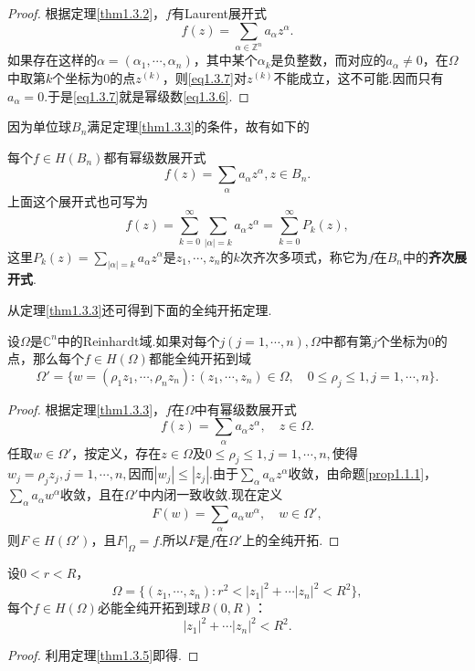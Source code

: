 \begin{proof}
	根据定理\ref{thm1.3.2}，$f$有Laurent展开式
	\begin{equation}\label{eq1.3.7}
		f(z)=\sum_{\alpha\in\mathbb{Z}^n} a_\alpha z^\alpha .
	\end{equation}
如果存在这样的$\alpha=(\alpha_1,\cdots,\alpha_n)$，其中某个$\alpha_k$是负整数，而对应的$a_\alpha\neq0$，在$\Omega$中取第$k$个坐标为$0$的点$z^{(k)}$，则\eqref{eq1.3.7}对$z^{(k)}$不能成立，这不可能.因而只有$a_\alpha=0$.于是\eqref{eq1.3.7}就是幂级数\eqref{eq1.3.6}.
\end{proof}
因为单位球$B_n$满足定理\ref{thm1.3.3}的条件，故有如下的
\begin{corollary}\label{cor1.3.4}
	每个$f\in H(B_n)$都有幂级数展开式
	\[f(z)=\sum_\alpha a_\alpha z^\alpha,z\in B_n.\]
	上面这个展开式也可写为
	\[f(z)=\sum_{k=0}^{\infty} \sum_{|\alpha|=k}a_\alpha z^\alpha =\sum_{k=0}^{\infty}P_k(z),\]
	这里$P_k(z)=\sum\limits_{|\alpha|=k}a_\alpha z^\alpha$是$z_1,\cdots,z_n$的$k$次齐次多项式，称它为$f$在$B_n$中的\textbf{齐次展开式}.
\end{corollary}
从定理\ref{thm1.3.3}还可得到下面的全纯开拓定理.
\begin{theorem}\label{thm1.3.5}
	设$\Omega$是$\mathbb{C}^n$中的Reinhardt域.如果对每个$j(j=1,\cdots,n),\Omega$中都有第$j$个坐标为$0$的点，那么每个$f\in H(\Omega)$都能全纯开拓到域
	\[\Omega'=\{w=(\rho_1 z_1,\cdots,\rho_n z_n)\colon (z_1,\cdots,z_n)\in\Omega,\quad 0\le \rho_j\le 1,j=1,\cdots,n\}.\]
\end{theorem}
\begin{proof}
	根据定理\ref{thm1.3.3}，$f$在$\Omega$中有幂级数展开式
	\[f(z)=\sum_\alpha a_\alpha z^\alpha,\quad z\in\Omega.\]
	任取$w\in\Omega'$，按定义，存在$z\in\Omega$及$0\le\rho_j\le1,j=1,\cdots,n,$使得$w_j=\rho_j z_j,j=1,\cdots,n,$因而$|w_j|\le|z_j|$.由于$\sum\limits_\alpha a_\alpha z^\alpha$收敛，由命题\ref{prop1.1.1}，$\sum\limits_\alpha a_\alpha w^\alpha$收敛，且在$\Omega'$中内闭一致收敛.现在定义
	\[F(w)=\sum_\alpha a_\alpha w^\alpha ,\quad w\in\Omega' ,\]
	则$F\in H(\Omega')$，且$F|_\Omega =f$.所以$F$是$f$在$\Omega'$上的全纯开拓.
\end{proof}
\begin{corollary}\label{cor1.3.6}
	设$0<r<R$，
	\[\Omega=\{(z_1,\cdots,z_n)\colon r^2<|z_1|^2+\cdots|z_n|^2<R^2\},\]
	每个$f\in H(\Omega)$必能全纯开拓到球$B(0,R)$：
	\[|z_1|^2+\cdots|z_n|^2<R^2.\]
\end{corollary}
\begin{proof}
	利用定理\ref{thm1.3.5}即得.
\end{proof}
